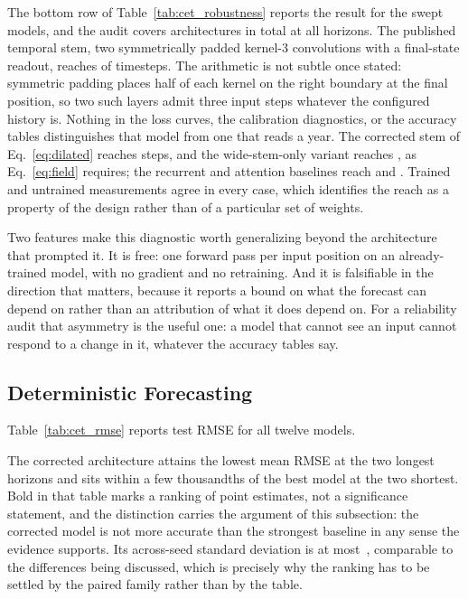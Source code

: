 The bottom row of Table~\ref{tab:cet_robustness} reports the result for the swept models, and the audit covers \robustFieldModels{} architectures in total at all \robustFieldHorizons{} horizons. The published temporal stem, two symmetrically padded kernel-3 convolutions with a final-state readout, reaches \robustFieldPublished{} of \robustHistory{} timesteps. The arithmetic is not subtle once stated: symmetric padding places half of each kernel on the right boundary at the final position, so two such layers admit three input steps whatever the configured history is. Nothing in the loss curves, the calibration diagnostics, or the accuracy tables distinguishes that model from one that reads a year. The corrected stem of Eq.~\eqref{eq:dilated} reaches \robustFieldTrust{} steps, and the wide-stem-only variant reaches \robustFieldDilated{}, as Eq.~\eqref{eq:field} requires; the recurrent and attention baselines reach \robustFieldKan{} and \robustFieldTransformer{}. Trained and untrained measurements agree in every case, which identifies the reach as a property of the design rather than of a particular set of weights.

Two features make this diagnostic worth generalizing beyond the architecture that prompted it. It is free: one forward pass per input position on an already-trained model, with no gradient and no retraining. And it is falsifiable in the direction that matters, because it reports a bound on what the forecast can depend on rather than an attribution of what it does depend on. For a reliability audit that asymmetry is the useful one: a model that cannot see an input cannot respond to a change in it, whatever the accuracy tables say.

\subsection{Deterministic Forecasting}
\label{sec:results_accuracy}

Table~\ref{tab:cet_rmse} reports test RMSE for all twelve models.


The corrected architecture attains the lowest mean RMSE at the two longest horizons and sits within a few thousandths of the best model at the two shortest. Bold in that table marks a ranking of point estimates, not a significance statement, and the distinction carries the argument of this subsection: the corrected model is not more accurate than the strongest baseline in any sense the evidence supports. Its across-seed standard deviation is at most \benchSeedSdTrust{}\,\degC{}, comparable to the differences being discussed, which is precisely why the ranking has to be settled by the paired family rather than by the table.

